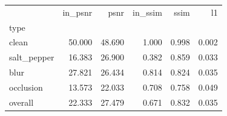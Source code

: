 \begin{tabular}{lrrrrr}
\toprule
 & in_psnr & psnr & in_ssim & ssim & l1 \\
type &  &  &  &  &  \\
\midrule
clean & 50.000 & 48.690 & 1.000 & 0.998 & 0.002 \\
salt_pepper & 16.383 & 26.900 & 0.382 & 0.859 & 0.033 \\
blur & 27.821 & 26.434 & 0.814 & 0.824 & 0.035 \\
occlusion & 13.573 & 22.033 & 0.708 & 0.758 & 0.049 \\
overall & 22.333 & 27.479 & 0.671 & 0.832 & 0.035 \\
\bottomrule
\end{tabular}
